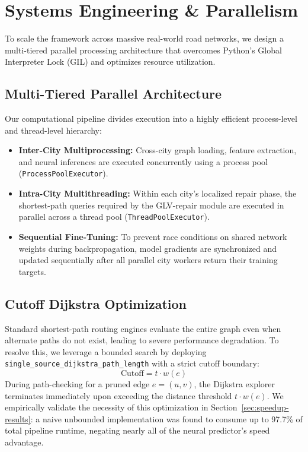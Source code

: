 \documentclass[journal]{IEEEtran}
\begin{document}
\section{Systems Engineering \& Parallelism}

To scale the framework across massive real-world road networks, we design a multi-tiered parallel processing architecture that overcomes Python's Global Interpreter Lock (GIL) and optimizes resource utilization.

\subsection{Multi-Tiered Parallel Architecture}
Our computational pipeline divides execution into a highly efficient process-level and thread-level hierarchy:
\begin{itemize}
    \item \textbf{Inter-City Multiprocessing:} Cross-city graph loading, feature extraction, and neural inferences are executed concurrently using a process pool (\texttt{ProcessPoolExecutor}).
    \item \textbf{Intra-City Multithreading:} Within each city's localized repair phase, the shortest-path queries required by the GLV-repair module are executed in parallel across a thread pool (\texttt{ThreadPoolExecutor}).
    \item \textbf{Sequential Fine-Tuning:} To prevent race conditions on shared network weights during backpropagation, model gradients are synchronized and updated sequentially after all parallel city workers return their training targets.
\end{itemize}

\subsection{Cutoff Dijkstra Optimization}
\label{sec:cutoff}
Standard shortest-path routing engines evaluate the entire graph even when alternate paths do not exist, leading to severe performance degradation. To resolve this, we leverage a bounded search by deploying \texttt{single\_source\_dijkstra\_path\_length} with a strict cutoff boundary:
\begin{equation}
    \text{Cutoff} = t \cdot w(e)
\end{equation}
During path-checking for a pruned edge $e=(u, v)$, the Dijkstra explorer terminates immediately upon exceeding the distance threshold $t \cdot w(e)$. We empirically validate the necessity of this optimization in Section~\ref{sec:speedup-results}: a naive unbounded implementation was found to consume up to 97.7\% of total pipeline runtime, negating nearly all of the neural predictor's speed advantage.
\end{document}
